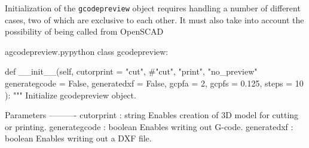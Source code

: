 \documentclass{ltxdoc}
\begin{document}
Initialization of the \texttt{gcodepreview} object requires handling a number of different cases, two of which are exclusive to each other. It must also take into account the possibility of being called from OpenSCAD

\lstset{firstnumber=\thegcpy}
\begin{writecode}{a}{gcodepreview.py}{python}
class gcodepreview:

    def __init__(self, 
                 cutorprint = "cut", #"cut", "print", "no_preview"
                 generategcode = False,
                 generatedxf = False,
                 gcpfa = 2,
                 gcpfs = 0.125,
                 steps = 10
                 ):
        """
        Initialize gcodepreview object.
    
        Parameters
        ----------
        cutorprint    : string
                        Enables creation of 3D model for cutting or printing.
        generategcode : boolean
                        Enables writing out G-code.
        generatedxf   : boolean
                        Enables writing out a DXF file.
        

\end{writecode}
\end{document}
